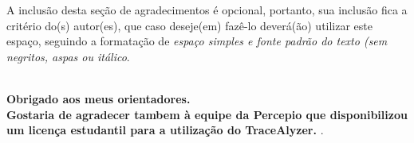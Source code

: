 \begin{comment}


\end{comment}

\begin{agradecimentos}
	A inclusão desta seção de agradecimentos é opcional, portanto, sua inclusão 
	fica a critério do(s) autor(es), que caso deseje(em) fazê-lo deverá(ão) 
	utilizar este espaço, seguindo a formatação de \textit{espaço simples e 
		fonte padrão do texto (sem negritos, aspas ou itálico}.
	
	\textbf{\\Obrigado aos meus orientadores. \\Gostaria de agradecer tambem à equipe da Percepio que disponibilizou um licença estudantil para a utilização do TraceAlyzer.
	}.
\end{agradecimentos}

